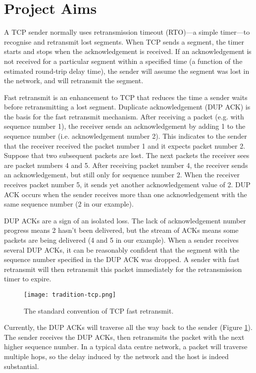  \section{Project Aims}
 \label{sec:aim}
 A TCP sender normally uses retransmission timeout (RTO)—a simple timer—to recognise and retransmit lost segments. When TCP sends a segment, the timer starts and stops when the acknowledgement is received. If an acknowledgement is not received for a particular segment within a specified time (a function of the estimated round-trip delay time), the sender will assume the segment was lost in the network, and will retransmit the segment.
 
Fast retransmit is an enhancement to TCP that reduces the time a sender waits before retransmitting a lost segment. Duplicate acknowledgement (DUP ACK) is the basis for the fast retransmit mechanism. After receiving a packet (e.g. with sequence number 1), the receiver sends an acknowledgement by adding 1 to the sequence number (i.e. acknowledgement number 2). This indicates to the sender that the receiver received the packet number 1 and it expects packet number 2. Suppose that two subsequent packets are lost. The next packets the receiver sees are packet numbers 4 and 5. After receiving packet number 4, the receiver sends an acknowledgement, but still only for sequence number 2. When the receiver receives packet number 5, it sends yet another acknowledgement value of 2. DUP ACK occurs when the sender receives more than one acknowledgement with the same sequence number (2 in our example).

DUP ACKs are a sign of an isolated loss. The lack of acknowledgement number progress means 2 hasn’t been delivered, but the stream of ACKs means some packets are being delivered (4 and 5 in our example). When a sender receives several DUP ACKs, it can be reasonably confident that the segment with the sequence number specified in the DUP ACK was dropped. A sender with fast retransmit will then retransmit this packet immediately for the retransmission timer to expire.

\begin{figure}[h]
	\centering
	\texttt{[image: tradition-tcp.png]}
	\caption{The standard convention of TCP fast retransmit.}
	\label{fig:tradition-tcp}
\end{figure}

Currently, the DUP ACKs will traverse all the way back to the sender (Figure \ref{fig:tradition-tcp}). The sender receives the DUP ACKs, then retransmits the packet with the next higher sequence number. In a typical data centre network, a packet will traverse multiple hops, so the delay induced by the network and the host is indeed substantial.

